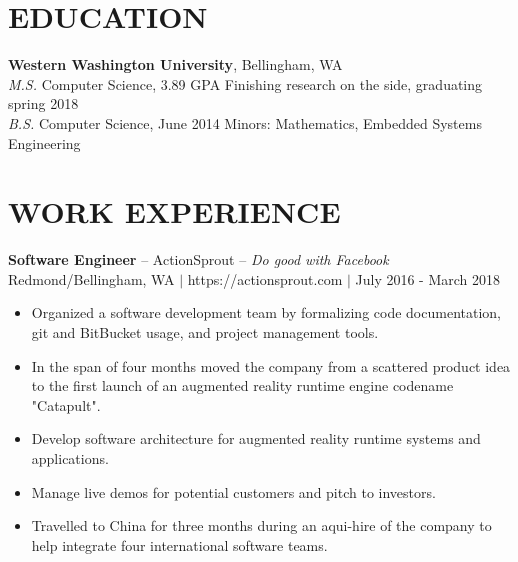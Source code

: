 \documentclass[line,margin]{res}
\begin{document}
\address{425.241.7977 $|$ kyle@kylerader.ninja $|$ https://kylerader.ninja $|$ github.com/kyle-rader}

\begin{resume}

\section{EDUCATION}
    {\bf Western Washington University}, Bellingham, WA \\
    {\sl M.S.} Computer Science, 3.89 GPA {\small Finishing research on the side, graduating spring 2018 } \\
    {\sl B.S.} Computer Science, {\small June 2014} Minors: Mathematics, Embedded Systems Engineering

\section{WORK EXPERIENCE}

    {\bf Software Engineer} -- ActionSprout -- {\sl Do good with Facebook } \\
    {\footnotesize Redmond/Bellingham, WA $|$ https://actionsprout.com $|$ July 2016 - March 2018 }
    \begin{itemize} \itemsep -1pt
        \item Organized a software development team by formalizing code documentation,
            git and BitBucket usage, and project management tools.
        \item In the span of four months moved the company from a scattered product idea to the first launch of an augmented reality runtime engine codename "Catapult".
        \item Develop software architecture for augmented reality runtime systems and applications.
        \item Manage live demos for potential customers and pitch to investors.
        \item Travelled to China for three months during an aqui-hire of the company to help integrate four international software teams.
    \end{itemize}


\end{resume}
\end{document}
